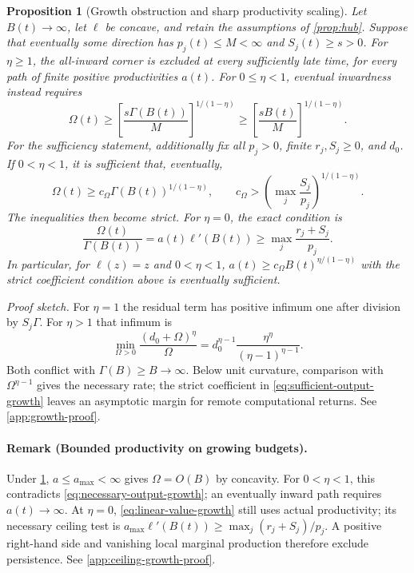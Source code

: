 \documentclass[11pt,a4paper]{article}
\newtheorem{proposition}{Proposition}
\theoremstyle{definition}\newtheorem{definition}{Definition}
\begin{document}
\begin{proposition}[Growth obstruction and sharp productivity scaling]
\label{prop:growth-trichotomy}
Let $B(t)\to\infty$, let $\ell$ be concave, and retain the assumptions
of \cref{prop:hub}. Suppose that eventually some direction has
$p_j(t)\leq M<\infty$ and $S_j(t)\geq s>0$.
For $\eta\geq1$, the all-inward corner is excluded at every sufficiently
late time, for every path of finite positive productivities $a(t)$.
For $0\leq\eta<1$, eventual inwardness instead requires
\begin{equation}
 \Omega(t)\geq
 \left[\frac{s\Gamma(B(t))}{M}\right]^{1/(1-\eta)}
 \geq\left[\frac{sB(t)}{M}\right]^{1/(1-\eta)}.
 \label{eq:necessary-output-growth}
\end{equation}
For the sufficiency statement, additionally fix all $p_j>0$, finite
$r_j,S_j\geq0$, and $d_0$. If $0<\eta<1$, it is sufficient that,
eventually,
\begin{equation}
 \Omega(t)\geq c_\Omega\Gamma(B(t))^{1/(1-\eta)},\qquad
 c_\Omega>
 \left(\max_j\frac{S_j}{p_j}\right)^{1/(1-\eta)}.
 \label{eq:sufficient-output-growth}
\end{equation}
The inequalities then become strict. For $\eta=0$, the exact condition is
\begin{equation}
 \frac{\Omega(t)}{\Gamma(B(t))}=a(t)\ell'(B(t))
 \geq\max_j\frac{r_j+S_j}{p_j}.
 \label{eq:linear-value-growth}
\end{equation}
In particular, for $\ell(z)=z$ and $0<\eta<1$,
$a(t)\geq c_\Omega B(t)^{\eta/(1-\eta)}$ with the strict coefficient
condition above is eventually sufficient.
\end{proposition}
\noindent\emph{Proof sketch.}
For $\eta=1$ the residual term has positive infimum one after division
by $S_j\Gamma$. For $\eta>1$ that infimum is
\begin{equation}
 \min_{\Omega>0}\frac{(d_0+\Omega)^\eta}{\Omega}
 =d_0^{\eta-1}\frac{\eta^\eta}{(\eta-1)^{\eta-1}}.
 \label{eq:residual-minimum}
\end{equation}
Both conflict with $\Gamma(B)\geq B\to\infty$. Below unit curvature,
comparison with $\Omega^{\eta-1}$ gives the necessary rate; the strict
coefficient in \cref{eq:sufficient-output-growth} leaves an asymptotic
margin for remote computational returns. See \cref{app:growth-proof}.

\paragraph{Remark (Bounded productivity on growing budgets).}
Under \cref{prop:growth-trichotomy}, $a\leq a_{\max}<\infty$ gives
$\Omega=O(B)$ by concavity. For $0<\eta<1$, this contradicts
\cref{eq:necessary-output-growth}; an eventually inward path requires
$a(t)\to\infty$. At $\eta=0$, \cref{eq:linear-value-growth} still uses
actual productivity; its necessary ceiling test is
$a_{\max}\ell'(B(t))\geq\max_j(r_j+S_j)/p_j$.
A positive right-hand side and vanishing local marginal production
therefore exclude persistence. See \cref{app:ceiling-growth-proof}.
\end{document}
